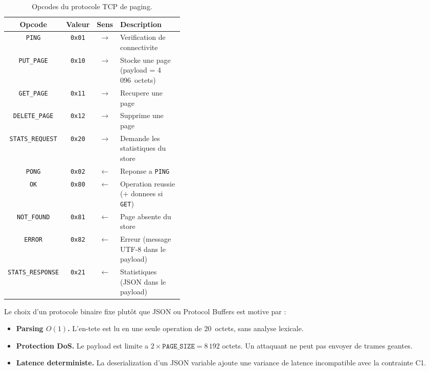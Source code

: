 \begin{table}[htbp]
    \centering
    \caption{Opcodes du protocole TCP de paging.}
    \label{tab:opcodes-tcp}
    \begin{tabular}{c c c p{0.40\linewidth}}
        \toprule
        \textbf{Opcode} & \textbf{Valeur} & \textbf{Sens} & \textbf{Description} \\
        \midrule
        \texttt{PING} & \texttt{0x01} & $\to$ & Verification de connectivite \\
        \texttt{PUT\_PAGE} & \texttt{0x10} & $\to$ & Stocke une page (payload = 4\,096~octets) \\
        \texttt{GET\_PAGE} & \texttt{0x11} & $\to$ & Recupere une page \\
        \texttt{DELETE\_PAGE} & \texttt{0x12} & $\to$ & Supprime une page \\
        \texttt{STATS\_REQUEST} & \texttt{0x20} & $\to$ & Demande les statistiques du store \\
        \midrule
        \texttt{PONG} & \texttt{0x02} & $\leftarrow$ & Reponse a \texttt{PING} \\
        \texttt{OK} & \texttt{0x80} & $\leftarrow$ & Operation reussie (+ donnees si \texttt{GET}) \\
        \texttt{NOT\_FOUND} & \texttt{0x81} & $\leftarrow$ & Page absente du store \\
        \texttt{ERROR} & \texttt{0x82} & $\leftarrow$ & Erreur (message UTF-8 dans le payload) \\
        \texttt{STATS\_RESPONSE} & \texttt{0x21} & $\leftarrow$ & Statistiques (JSON dans le payload) \\
        \bottomrule
    \end{tabular}
\end{table}

Le choix d'un protocole binaire fixe plut\^ot que JSON ou Protocol Buffers est motive par :

\begin{itemize}
    \item \textbf{Parsing $O(1)$.} L'en-tete est lu en une seule operation de 20~octets, sans analyse lexicale.
    \item \textbf{Protection DoS.} Le payload est limite a $2 \times \texttt{PAGE\_SIZE} = 8\,192$ octets. Un attaquant ne peut pas envoyer de trames geantes.
    \item \textbf{Latence deterministe.} La deserialization d'un JSON variable ajoute une variance de latence incompatible avec la contrainte C1.
\end{itemize}

